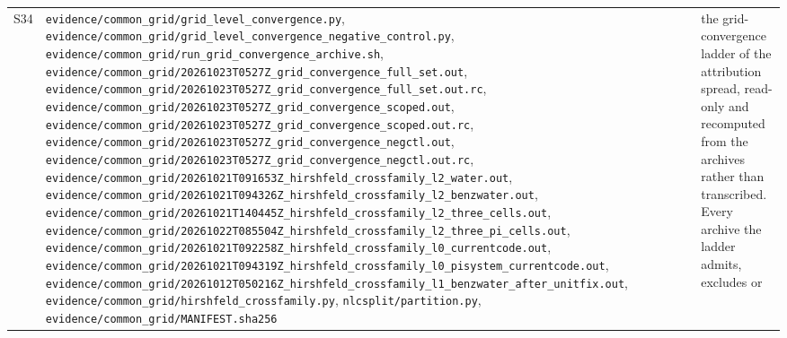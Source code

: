 \documentclass[11pt]{article}
\begin{document}
\begin{longtable}{c>{\raggedright\arraybackslash}p{}>{\raggedright\arraybackslash}p{}}
S34 & \texttt{evidence/\allowbreak{}common\_\allowbreak{}grid/\allowbreak{}grid\_\allowbreak{}level\_\allowbreak{}convergence.py}, \texttt{evidence/\allowbreak{}common\_\allowbreak{}grid/\allowbreak{}grid\_\allowbreak{}level\_\allowbreak{}convergence\_\allowbreak{}negative\_\allowbreak{}control.py}, \texttt{evidence/\allowbreak{}common\_\allowbreak{}grid/\allowbreak{}run\_\allowbreak{}grid\_\allowbreak{}convergence\_\allowbreak{}archive.sh}, \texttt{evidence/\allowbreak{}common\_\allowbreak{}grid/\allowbreak{}20261023T0527Z\_\allowbreak{}grid\_\allowbreak{}convergence\_\allowbreak{}full\_\allowbreak{}set.out}, \texttt{evidence/\allowbreak{}common\_\allowbreak{}grid/\allowbreak{}20261023T0527Z\_\allowbreak{}grid\_\allowbreak{}convergence\_\allowbreak{}full\_\allowbreak{}set.out.rc}, \texttt{evidence/\allowbreak{}common\_\allowbreak{}grid/\allowbreak{}20261023T0527Z\_\allowbreak{}grid\_\allowbreak{}convergence\_\allowbreak{}scoped.out}, \texttt{evidence/\allowbreak{}common\_\allowbreak{}grid/\allowbreak{}20261023T0527Z\_\allowbreak{}grid\_\allowbreak{}convergence\_\allowbreak{}scoped.out.rc}, \texttt{evidence/\allowbreak{}common\_\allowbreak{}grid/\allowbreak{}20261023T0527Z\_\allowbreak{}grid\_\allowbreak{}convergence\_\allowbreak{}negctl.out}, \texttt{evidence/\allowbreak{}common\_\allowbreak{}grid/\allowbreak{}20261023T0527Z\_\allowbreak{}grid\_\allowbreak{}convergence\_\allowbreak{}negctl.out.rc}, \texttt{evidence/\allowbreak{}common\_\allowbreak{}grid/\allowbreak{}20261021T091653Z\_\allowbreak{}hirshfeld\_\allowbreak{}crossfamily\_\allowbreak{}l2\_\allowbreak{}water.out}, \texttt{evidence/\allowbreak{}common\_\allowbreak{}grid/\allowbreak{}20261021T094326Z\_\allowbreak{}hirshfeld\_\allowbreak{}crossfamily\_\allowbreak{}l2\_\allowbreak{}benzwater.out}, \texttt{evidence/\allowbreak{}common\_\allowbreak{}grid/\allowbreak{}20261021T140445Z\_\allowbreak{}hirshfeld\_\allowbreak{}crossfamily\_\allowbreak{}l2\_\allowbreak{}three\_\allowbreak{}cells.out}, \texttt{evidence/\allowbreak{}common\_\allowbreak{}grid/\allowbreak{}20261022T085504Z\_\allowbreak{}hirshfeld\_\allowbreak{}crossfamily\_\allowbreak{}l2\_\allowbreak{}three\_\allowbreak{}pi\_\allowbreak{}cells.out}, \texttt{evidence/\allowbreak{}common\_\allowbreak{}grid/\allowbreak{}20261021T092258Z\_\allowbreak{}hirshfeld\_\allowbreak{}crossfamily\_\allowbreak{}l0\_\allowbreak{}currentcode.out}, \texttt{evidence/\allowbreak{}common\_\allowbreak{}grid/\allowbreak{}20261021T094319Z\_\allowbreak{}hirshfeld\_\allowbreak{}crossfamily\_\allowbreak{}l0\_\allowbreak{}pisystem\_\allowbreak{}currentcode.out}, \texttt{evidence/\allowbreak{}common\_\allowbreak{}grid/\allowbreak{}20261012T050216Z\_\allowbreak{}hirshfeld\_\allowbreak{}crossfamily\_\allowbreak{}l1\_\allowbreak{}benzwater\_\allowbreak{}after\_\allowbreak{}unitfix.out}, \texttt{evidence/\allowbreak{}common\_\allowbreak{}grid/\allowbreak{}hirshfeld\_\allowbreak{}crossfamily.py}, \texttt{nlcsplit/partition.py}, \texttt{evidence/\allowbreak{}common\_\allowbreak{}grid/\allowbreak{}MANIFEST.sha256} & the grid-convergence ladder of the attribution spread, read-only and recomputed from the archives rather than transcribed. Every archive the ladder admits, excludes or 
\end{longtable}
\end{document}
